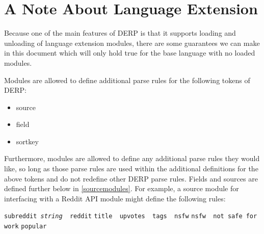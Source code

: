 \section{A Note About Language Extension}
Because one of the main features of DERP is that it supports loading and unloading
of language extension modules, there are some guarantees we can make in this document
which will only hold true for the base language with no loaded modules.

Modules are allowed to define additional parse rules for the following tokens of DERP:
\begin{itemize}
\item source
\item field
\item sortkey
\end{itemize}
Furthermore, modules are allowed to define any additional parse rules they would like, so
long as those parse rules are used within the additional definitions for the above tokens
and do not redefine other DERP parse rules. Fields and sources are defined further below in \ref{sourcemodules}.
For example, a source module for interfacing with a Reddit API module might define the following rules:
\begin{description}[labelindent=1cm,leftmargin=\onelen,labelwidth=1cm]
     \texttt{subreddit \textit{string} \textbf{\textbar} reddit}
     \texttt{title \textbf{\textbar} upvotes \textbf{\textbar} tags \textbf{\textbar} nsfw}
     \texttt{nsfw \textbf{\textbar} not safe for work}
     \texttt{popular}
\end{description}

